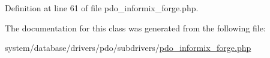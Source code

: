 Definition at line 61 of file pdo\+\_\+informix\+\_\+forge.\+php.



The documentation for this class was generated from the following file\+:\begin{DoxyCompactItemize}
\item 
system/database/drivers/pdo/subdrivers/\mbox{\hyperlink{pdo__informix__forge_8php}{pdo\+\_\+informix\+\_\+forge.\+php}}\end{DoxyCompactItemize}
